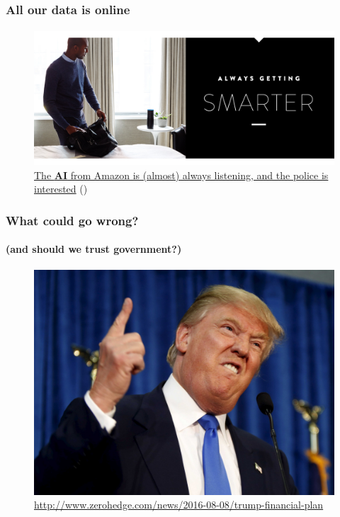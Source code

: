 	\begin{frame}
	\frametitle{All our data is online}
	\framesubtitle{}
	        \begin{figure}[h]
                \centering
                \includegraphics[width=.8\textwidth]{../pics/alexa-feature-smarter}
		\caption{\href{http://www.forbes.com/sites/tonybradley/2017/01/05/alexa-is-listening-but-amazon-values-privacy-and-gives-you-control/\#7c920725eed5}{The \textbf{AI} from Amazon is (almost) always listening, and the police is interested} (\cite{bradley2017})}
        	\end{figure}
	\end{frame}

	\begin{frame}
	\frametitle{What could go wrong?}
	\framesubtitle{(and should we trust government?)}
	        \begin{figure}[h]
                \centering
                \includegraphics[width=.8\textwidth]{../pics/Trump_fingerup}
		\caption{\tiny\url{http://www.zerohedge.com/news/2016-08-08/trump-financial-plan}}
        	\end{figure}
	\end{frame}

